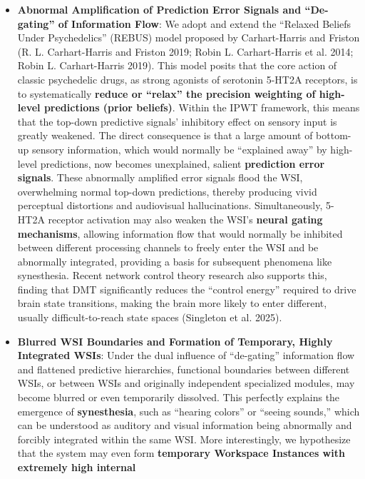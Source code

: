 \documentclass[
  a4paper]{article}
\begin{document}
\begin{itemize}
\item
  \textbf{Abnormal Amplification of Prediction Error Signals and
  ``De-gating'' of Information Flow}: We adopt and extend the ``Relaxed
  Beliefs Under Psychedelics'' (REBUS) model proposed by Carhart-Harris
  and Friston (R. L. Carhart-Harris and Friston 2019; Robin L.
  Carhart-Harris et al. 2014; Robin L. Carhart-Harris 2019). This model
  posits that the core action of classic psychedelic drugs, as strong
  agonists of serotonin 5-HT2A receptors, is to systematically
  \textbf{reduce or ``relax'' the precision weighting of high-level
  predictions (prior beliefs)}. Within the IPWT framework, this means
  that the top-down predictive signals' inhibitory effect on sensory
  input is greatly weakened. The direct consequence is that a large
  amount of bottom-up sensory information, which would normally be
  ``explained away'' by high-level predictions, now becomes unexplained,
  salient \textbf{prediction error signals}. These abnormally amplified
  error signals flood the WSI, overwhelming normal top-down predictions,
  thereby producing vivid perceptual distortions and audiovisual
  hallucinations. Simultaneously, 5-HT2A receptor activation may also
  weaken the WSI's \textbf{neural gating mechanisms}, allowing
  information flow that would normally be inhibited between different
  processing channels to freely enter the WSI and be abnormally
  integrated, providing a basis for subsequent phenomena like
  synesthesia. Recent network control theory research also supports
  this, finding that DMT significantly reduces the ``control energy''
  required to drive brain state transitions, making the brain more
  likely to enter different, usually difficult-to-reach state spaces
  (Singleton et al. 2025).
\item
  \textbf{Blurred WSI Boundaries and Formation of Temporary, Highly
  Integrated WSIs}: Under the dual influence of ``de-gating''
  information flow and flattened predictive hierarchies, functional
  boundaries between different WSIs, or between WSIs and originally
  independent specialized modules, may become blurred or even
  temporarily dissolved. This perfectly explains the emergence of
  \textbf{synesthesia}, such as ``hearing colors'' or ``seeing sounds,''
  which can be understood as auditory and visual information being
  abnormally and forcibly integrated within the same WSI. More
  interestingly, we hypothesize that the system may even form
  \textbf{temporary Workspace Instances with extremely high internal
}
\end{itemize}
\end{document}
